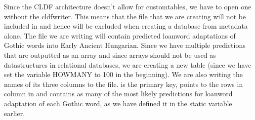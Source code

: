 \documentclass[letterpaper,10pt,english]{sphinxmanual}
\begin{document}
\sphinxAtStartPar
Since the CLDF architecture doesn’t allow for custom\sphinxhyphen{}tables, we have to
open one without the cldf\sphinxhyphen{}writer. This means that the file that we are
creating will not be included in  and hence will
be excluded when creating a database from metadata alone. The file we are
writing will contain predicted loanword adaptations of Gothic words into
Early Ancient Hungarian. Since we have multiple predictions that are
outputted as an array and since arrays should not be used as data\sphinxhyphen{}structures
in relational databases, we are creating a new table 
(since we have set the variable HOWMANY to 100 in the beginning). We
are also writing the names of its three columns to the file.  is the
primary key,  points to the rows in column  in
 and  contains as many of the most likely
predictions for loanword adaptation of each Gothic word, as we have defined
it in the static variable  earlier.
\end{document}
